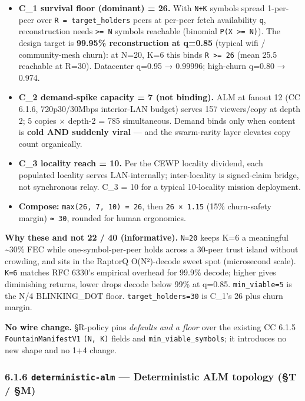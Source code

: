 \documentclass[11pt]{article}
\begin{document}
\begin{itemize}\setlength\itemsep{0pt}
\item \textbf{C\_1 survival floor (dominant) = 26.} With \texttt{N+K} symbols spread 1-per-peer over \texttt{R = target\_holders} peers at per-peer fetch availability \texttt{q}, reconstruction needs \texttt{>= N} symbols reachable (binomial \texttt{P(X >= N)}). The design target is \textbf{99.95\% reconstruction at q=0.85} (typical wifi / community-mesh churn): at N=20, K=6 this binds \texttt{R >= 26} (mean 25.5 reachable at R=30). Datacenter q=0.95 → 0.99996; high-churn q=0.80 → 0.974.
\item \textbf{C\_2 demand-spike capacity = 7 (not binding).} ALM at fanout 12 (CC 6.1.6, 720p30/30Mbps interior-LAN budget) serves 157 viewers/copy at depth 2; 5 copies × depth-2 = 785 simultaneous. Demand binds only when content is \textbf{cold AND suddenly viral} — and the swarm-rarity layer elevates copy count organically.
\item \textbf{C\_3 locality reach = 10.} Per the CEWP locality dividend, each populated locality serves LAN-internally; inter-locality is signed-claim bridge, not synchronous relay. C\_3 = 10 for a typical 10-locality mission deployment.
\item \textbf{Compose:} \texttt{max(26, 7, 10) = 26}, then \texttt{26 × 1.15} (15\% churn-safety margin) \texttt{≈ 30}, rounded for human ergonomics.
\end{itemize}


\textbf{Why these and not 22 / 40 (informative).} \texttt{N=20} keeps K=6 a meaningful \textasciitilde{}30\% FEC while one-symbol-per-peer holds across a 30-peer trust island without crowding, and sits in the RaptorQ O(N²)-decode sweet spot (microsecond scale). \texttt{K=6} matches RFC 6330's empirical overhead for 99.9\% decode; higher gives diminishing returns, lower drops decode below 99\% at q=0.85. \texttt{min\_viable=5} is the N/4 BLINKING\_DOT floor. \texttt{target\_holders=30} is C\_1's 26 plus churn margin.


\textbf{No wire change.} §R-policy pins \textit{defaults and a floor} over the existing CC 6.1.5 \texttt{FountainManifestV1} \texttt{(N, K)} fields and \texttt{min\_viable\_symbols}; it introduces no new shape and no 1+4 change.


\subsubsection*{6.1.6 \texttt{deterministic-alm} — Deterministic ALM topology (§T / §M)}
\end{document}
